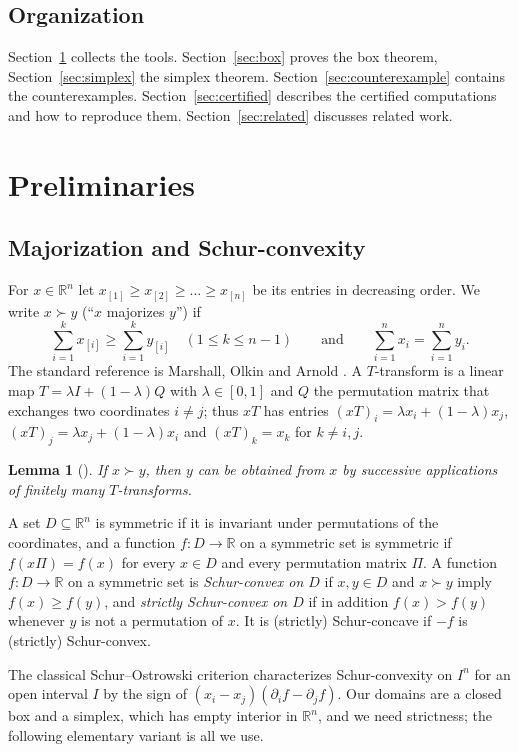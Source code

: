 \documentclass[11pt,a4paper]{article}
\theoremstyle{plain}
\newtheorem{lemma}[theorem]{Lemma}
\theoremstyle{definition}
\newcommand{\R}{\mathbb{R}}
\newcommand{\maj}{\succ}
\begin{document}
\subsection*{Organization}
Section~\ref{sec:prelim} collects the tools. Section~\ref{sec:box} proves the box theorem, Section~\ref{sec:simplex} the simplex theorem. Section~\ref{sec:counterexample} contains the counterexamples. Section~\ref{sec:certified} describes the certified computations and how to reproduce them. Section~\ref{sec:related} discusses related work.

\section{Preliminaries}\label{sec:prelim}

\subsection{Majorization and Schur-convexity}
For $x\in\R^n$ let $x_{[1]}\ge x_{[2]}\ge\dots\ge x_{[n]}$ be its entries in decreasing order. We write $x\maj y$ (``$x$ majorizes $y$'') if
\[
\sum_{i=1}^k x_{[i]}\ge\sum_{i=1}^k y_{[i]}\quad(1\le k\le n-1)\qquad\text{and}\qquad \sum_{i=1}^n x_i=\sum_{i=1}^n y_i .
\]
The standard reference is Marshall, Olkin and Arnold \cite{MarshallOlkinArnold2011}. A $T$-transform is a linear map $T=\lambda I+(1-\lambda)Q$ with $\lambda\in[0,1]$ and $Q$ the permutation matrix that exchanges two coordinates $i\ne j$; thus $xT$ has entries $(xT)_i=\lambda x_i+(1-\lambda)x_j$, $(xT)_j=\lambda x_j+(1-\lambda)x_i$ and $(xT)_k=x_k$ for $k\ne i,j$.

\begin{lemma}[{\cite[Lemma~2.B.1]{MarshallOlkinArnold2011}}]\label{lem:ttransform}
If $x\maj y$, then $y$ can be obtained from $x$ by successive applications of finitely many $T$-transforms.
\end{lemma}

A set $D\subseteq\R^n$ is symmetric if it is invariant under permutations of the coordinates, and a function $f\colon D\to\R$ on a symmetric set is symmetric if $f(x\Pi)=f(x)$ for every $x\in D$ and every permutation matrix $\Pi$. A function $f\colon D\to\R$ on a symmetric set is \emph{Schur-convex on $D$} if $x,y\in D$ and $x\maj y$ imply $f(x)\ge f(y)$, and \emph{strictly Schur-convex on $D$} if in addition $f(x)>f(y)$ whenever $y$ is not a permutation of $x$. It is (strictly) Schur-concave if $-f$ is (strictly) Schur-convex.

The classical Schur--Ostrowski criterion \cite[Theorem~3.A.4]{MarshallOlkinArnold2011} characterizes Schur-convexity on $I^n$ for an open interval $I$ by the sign of $(x_i-x_j)(\partial_i f-\partial_j f)$. Our domains are a closed box and a simplex, which has empty interior in $\R^n$, and we need strictness; the following elementary variant is all we use.
\end{document}
